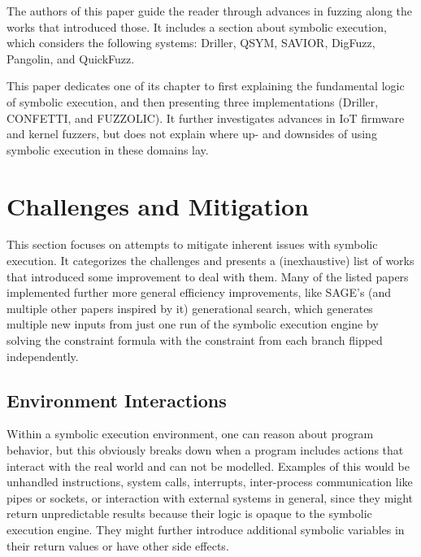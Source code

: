 \documentclass{article}
\begin{document}
\begin{multicols}{2}
    The authors of this paper guide the reader through advances in fuzzing along the works that introduced those. It includes a section about symbolic execution, which considers the following systems: Driller\cite{Driller}, QSYM\cite{QSYM}, SAVIOR\cite{SAVIOR}, DigFuzz\cite{DigFuzz}, Pangolin\cite{Pangolin}, and QuickFuzz\cite{QuickFuzz}.

    This paper dedicates one of its chapter to first explaining the fundamental logic of symbolic execution, and then presenting three implementations (Driller\cite{Driller}, CONFETTI\cite{CONFETTI}, and FUZZOLIC\cite{FUZZOLIC}). It further investigates advances in IoT firmware and kernel fuzzers, but does not explain where up- and downsides of using symbolic execution in these domains lay.

    \section{Challenges and Mitigation}
    \label{Results}
    This section focuses on attempts to mitigate inherent issues with symbolic execution. It categorizes the challenges and presents a (inexhaustive) list of works that introduced some improvement to deal with them. Many of the listed papers implemented further more general efficiency improvements, like SAGE's\cite{SAGE} (and multiple other papers inspired by it) generational search, which generates multiple new inputs from just one run of the symbolic execution engine by solving the constraint formula with the constraint from each branch flipped independently.

    \subsection{Environment Interactions}
    Within a symbolic execution environment, one can reason about program behavior, but this obviously breaks down when a program includes actions that interact with the real world and can not be modelled. Examples of this would be unhandled instructions, system calls, interrupts, inter-process communication like pipes or sockets, or interaction with external systems in general, since they might return unpredictable results because their logic is opaque to the symbolic execution engine.\cite{Demystifying} They might further introduce additional symbolic variables in their return values or have other side effects.


\end{multicols}
\end{document}
